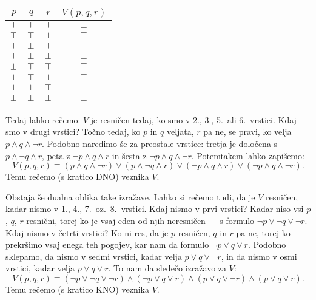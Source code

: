                 \begin{center}
                        \begin{tabular}{ccc|c}
                                $p$ & $q$ & $r$ & $V(p, q, r)$ \\
                                \hline
                                $\top$ & $\top$ & $\top$ & $\bot$ \\
                                $\top$ & $\top$ & $\bot$ & $\top$ \\
                                $\top$ & $\bot$ & $\top$ & $\top$ \\
                                $\top$ & $\bot$ & $\bot$ & $\bot$ \\
                                $\bot$ & $\top$ & $\top$ & $\top$ \\
                                $\bot$ & $\top$ & $\bot$ & $\top$ \\
                                $\bot$ & $\bot$ & $\top$ & $\bot$ \\
                                $\bot$ & $\bot$ & $\bot$ & $\bot$
                        \end{tabular}
                \end{center}

                Tedaj lahko rečemo: $V$ je resničen tedaj, ko smo v 2., 3., 5.~ali 6.~vrstici. Kdaj smo v drugi vrstici? Točno tedaj, ko $p$ in $q$ veljata, $r$ pa ne, se pravi, ko velja $p \land q \land \lnot{r}$. Podobno naredimo še za preostale vrstice: tretja je določena s $p \land \lnot{q} \land r$, peta z $\lnot{p} \land q \land r$ in šesta z $\lnot{p} \land q \land \lnot{r}$. Potemtakem lahko zapišemo:
                \[V(p, q, r) \equiv (p \land q \land \lnot{r}) \lor (p \land \lnot{q} \land r) \lor (\lnot{p} \land q \land r) \lor (\lnot{p} \land q \land \lnot{r}).\]
                Temu rečemo  (s kratico DNO) veznika $V$.

                Obstaja še dualna oblika take izražave. Lahko si rečemo tudi, da je $V$ resničen, kadar nismo v 1., 4., 7.~oz.~8.~vrstici. Kdaj nismo v prvi vrstici? Kadar niso vsi $p$, $q$, $r$ resnični, torej ko je vsaj eden od njih neresničen --- s formulo $\lnot{p} \lor \lnot{q} \lor \lnot{r}$. Kdaj nismo v četrti vrstici? Ko ni res, da je $p$ resničen, $q$ in $r$ pa ne, torej ko prekršimo vsaj enega teh pogojev, kar nam da formulo $\lnot{p} \lor q \lor r$. Podobno sklepamo, da nismo v sedmi vrstici, kadar velja $p \lor q \lor \lnot{r}$, in da nismo v osmi vrstici, kadar velja $p \lor q \lor r$. To nam da sledečo izražavo za $V$:
                \[V(p, q, r) \equiv (\lnot{p} \lor \lnot{q} \lor \lnot{r}) \land (\lnot{p} \lor q \lor r) \land (p \lor q \lor \lnot{r}) \land (p \lor q \lor r).\]
                Temu rečemo  (s kratico KNO) veznika $V$.

